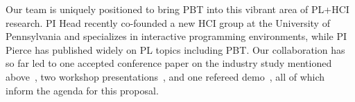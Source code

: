 
Our team is uniquely positioned to bring PBT into this vibrant area
of PL+HCI research.  PI Head recently
co-founded a new HCI group at
the University of Pennsylvania and specializes in interactive
programming environments, while PI Pierce has published widely on PL
topics including PBT.  Our collaboration has so far led to
one accepted conference paper on the industry study mentioned above~\cite{ref:goldstein2024property},
two workshop
presentations~\cite{goldstein_problems_2022,shi_towards_2023}, and one
refereed demo~\cite{ref:goldstein2023tyche}, all of which inform the
agenda for this proposal.

